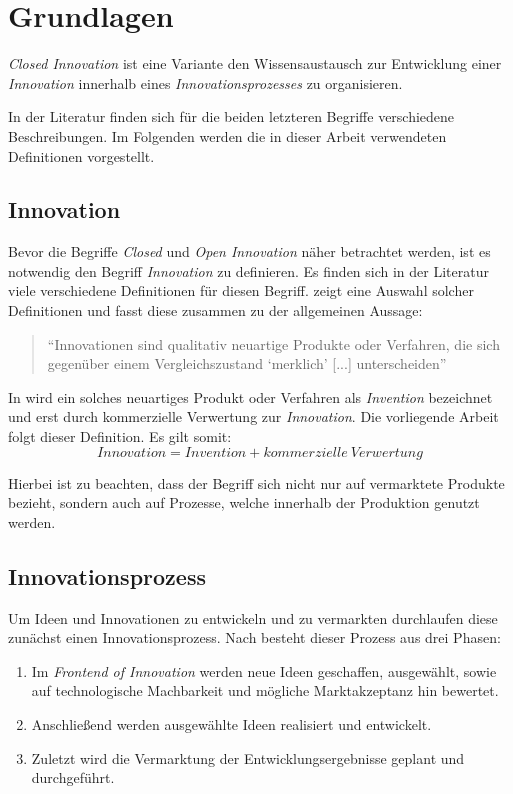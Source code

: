 \section{Grundlagen}\label{sec:grundlagen}
\textit{Closed Innovation} ist eine Variante den Wissensaustausch
zur Entwicklung einer \textit{Innovation}
innerhalb eines \textit{Innovationsprozesses} zu organisieren.

In der Literatur finden sich für die beiden letzteren Begriffe verschiedene Beschreibungen.
Im Folgenden werden die in dieser Arbeit verwendeten Definitionen vorgestellt.

\subsection{Innovation}\label{sec:grundlagen-inno}
Bevor die Begriffe \textit{Closed} und \textit{Open Innovation} näher betrachtet werden,
ist es notwendig den Begriff \textit{Innovation} zu definieren.
Es finden sich in der Literatur viele verschiedene Definitionen für diesen Begriff.
\cite[5]{hauschildt2016innovationsmanagement} zeigt eine Auswahl solcher Definitionen und fasst diese
zusammen zu der allgemeinen Aussage:
\begin{quote}
    \enquote{Innovationen sind qualitativ neuartige Produkte oder Verfahren,
    die sich gegenüber einem Vergleichszustand \enquote{merklich} [...] unterscheiden}
    \cite[4]{hauschildt2016innovationsmanagement}
\end{quote}

In \cite[9]{herzog2011} wird ein solches neuartiges Produkt oder Verfahren als \textit{Invention} bezeichnet und erst durch kommerzielle Verwertung zur \textit{Innovation}.
Die vorliegende Arbeit folgt dieser Definition.
Es gilt somit:
\begin{equation*}
    Innovation = Invention + kommerzielle~Verwertung
\end{equation*}

Hierbei ist zu beachten, dass der Begriff sich nicht nur auf vermarktete Produkte bezieht,
sondern auch auf Prozesse, welche innerhalb der Produktion genutzt werden.

\subsection{Innovationsprozess}\label{sec:grundlagen-prozess}
Um Ideen und Innovationen zu entwickeln und zu vermarkten durchlaufen diese zunächst einen Innovationsprozess.
Nach \cite[10\psq]{herzog2011} besteht dieser Prozess aus drei Phasen:
\begin{enumerate}
    \item Im \textit{Frontend of Innovation} werden neue Ideen geschaffen, ausgewählt, sowie auf technologische Machbarkeit und mögliche Marktakzeptanz hin bewertet.
    \item Anschließend werden ausgewählte Ideen realisiert und entwickelt.
    \item Zuletzt wird die Vermarktung der Entwicklungsergebnisse geplant und durchgeführt.
\end{enumerate}

